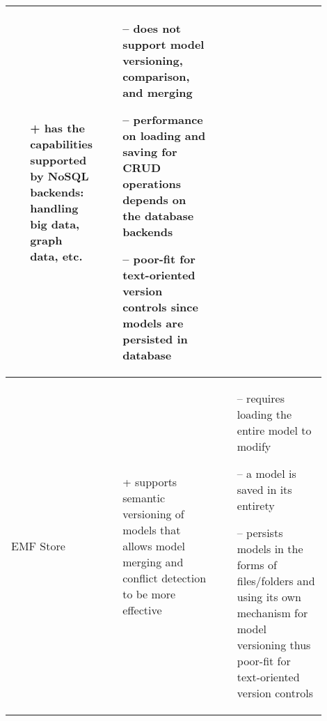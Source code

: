 \begin{table*}[]
\begin{scriptsize}
\begin{tabular}{
      |>{\centering\arraybackslash}m{0.1\linewidth}
      |>{\centering\arraybackslash}m{0.4\linewidth}
      |>{\centering\arraybackslash}m{0.4\linewidth}
      |}
\begin{minipage}[t]{\linewidth}
\begin{itemize}[leftmargin=7pt]
        \item[+] has the capabilities supported by NoSQL backends: handling big data, graph data, etc.
      \end{itemize}
    \end{minipage}
    &
    \begin{minipage}[t]{\linewidth}
      \raggedright
      \begin{itemize}[leftmargin=7pt]
        \setlength
        \item[--] does not support model versioning, comparison, and merging
        \item[--] performance on loading and saving for CRUD operations depends on the database backends
        \item[--] poor-fit for text-oriented version controls since models are persisted in database
      \end{itemize}
    \end{minipage} 
    \\
    \hline
    EMF Store
    &
    \begin{minipage}[t]{\linewidth}
      \raggedright
      \begin{itemize}[leftmargin=7pt]
        \setlength
        \item[+] supports semantic versioning of models that allows model merging and conflict detection to be more effective
      \end{itemize}
    \end{minipage}
    &
    \begin{minipage}[t]{\linewidth}
      \raggedright
      \begin{itemize}[leftmargin=7pt]
        \setlength
        \item[--] requires loading the entire model to modify
        \item[--] a model is saved in its entirety
        \item[--] persists models in the forms of files/folders and using its own mechanism for model versioning thus poor-fit for text-oriented version controls
      \end{itemize}
    \end{minipage} 
    \\
    \hline
  \end{tabular}
\end{scriptsize}
\end{table*}
  
